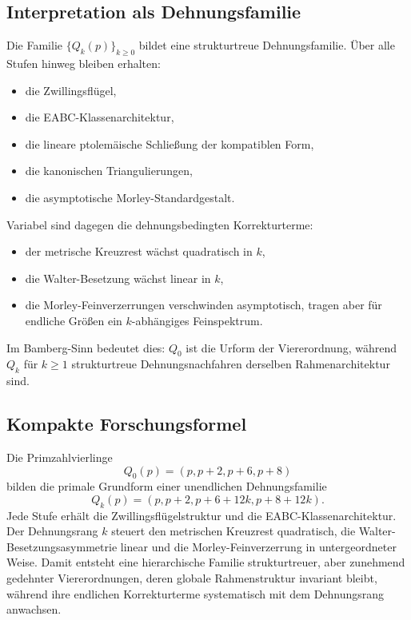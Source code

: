 \subsection{Interpretation als Dehnungsfamilie}

Die Familie \(\{Q_k(p)\}_{k\ge 0}\) bildet eine strukturtreue Dehnungsfamilie. Über alle Stufen hinweg bleiben erhalten:
\begin{itemize}
\item die Zwillingsflügel,
\item die EABC-Klassenarchitektur,
\item die lineare ptolemäische Schließung der kompatiblen Form,
\item die kanonischen Triangulierungen,
\item die asymptotische Morley-Standardgestalt.
\end{itemize}

Variabel sind dagegen die dehnungsbedingten Korrekturterme:
\begin{itemize}
\item der metrische Kreuzrest wächst quadratisch in \(k\),
\item die Walter-Besetzung wächst linear in \(k\),
\item die Morley-Feinverzerrungen verschwinden asymptotisch, tragen aber für endliche Größen ein \(k\)-abhängiges Feinspektrum.
\end{itemize}

Im Bamberg-Sinn bedeutet dies: \(Q_0\) ist die Urform der Viererordnung, während \(Q_k\) für \(k\ge 1\) strukturtreue Dehnungsnachfahren derselben Rahmenarchitektur sind.

\subsection{Kompakte Forschungsformel}

Die Primzahlvierlinge
\[
Q_0(p)=(p,p+2,p+6,p+8)
\]
bilden die primale Grundform einer unendlichen Dehnungsfamilie
\[
Q_k(p)=(p,p+2,p+6+12k,p+8+12k).
\]
Jede Stufe erhält die Zwillingsflügelstruktur und die EABC-Klassenarchitektur. Der Dehnungsrang \(k\) steuert den metrischen Kreuzrest quadratisch, die Walter-Besetzungsasymmetrie linear und die Morley-Feinverzerrung in untergeordneter Weise. Damit entsteht eine hierarchische Familie strukturtreuer, aber zunehmend gedehnter Viererordnungen, deren globale Rahmenstruktur invariant bleibt, während ihre endlichen Korrekturterme systematisch mit dem Dehnungsrang anwachsen.
